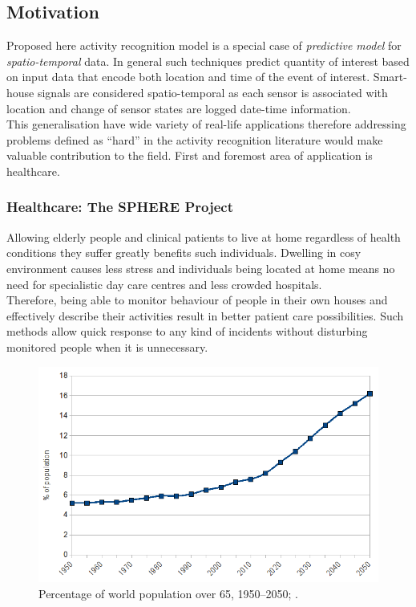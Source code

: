 \documentclass[11pt, a4paper, pdflatex, leqno, twoside, openright]{report}
\begin{document}
    \subsection{Motivation\label{sec:applications}} %
Proposed here activity recognition model is a special case of \emph{predictive model} for \emph{spatio-temporal} data. In general such techniques predict quantity of interest based on input data that encode both location and time of the event of interest. Smart-house signals are considered spatio-temporal as each sensor is associated with location and change of sensor states are logged date-time information.\\
This generalisation have wide variety of real-life applications therefore addressing problems defined as ``hard'' in the activity recognition literature would make valuable contribution to the field. 
First and foremost area of application is healthcare.

      \subsubsection{Healthcare: The SPHERE Project}
Allowing elderly people and clinical patients to live at home regardless of health conditions they suffer greatly benefits such individuals. Dwelling in cosy environment causes less stress and individuals being located at home means no need for specialistic day care centres and less crowded hospitals.\\
Therefore, being able to monitor behaviour of people in their own houses and effectively describe their activities result in better patient care possibilities. Such methods allow quick response to any kind of incidents without disturbing monitored people when it is unnecessary.

\begin{figure}
  \centering
  \includegraphics[scale=.5]{./gfx/populationOver65}
  \caption{Percentage of world population over 65, 1950--2050; \citep{populationAgeing}.\label{fig:agingPopulatiom}}
\end{figure}
\end{document}
